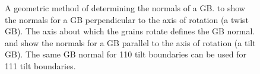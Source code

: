 \documentclass[12pt]{report}
\begin{document}
\begin{figure}[ht!]
 \quad
 \quad
 \caption[Geometric method of determining grain boundary normals.]{\label{fig:PlaneNorms}A geometric method of determining the normals of a GB.  \protect{} to \protect{} show the normals for a GB perpendicular to the axis of rotation (a twist GB).  The axis about which the grains rotate defines the GB normal. \protect{} and \protect{} show the normals for a GB parallel to the axis of rotation (a tilt GB).  The same GB normal for \textlangle{}110\textrangle{} tilt boundaries can be used for \textlangle{}111\textrangle{} tilt boundaries.}

\end{figure}
\end{document}
